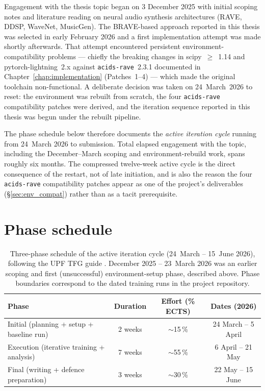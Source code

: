 \documentclass[a4paper,11pt,oneside,openany]{book}
\begin{document}
\begin{appendices}
Engagement with the thesis topic began on 3 December 2025 with initial scoping notes and literature reading on neural audio synthesis architectures (RAVE, DDSP, WaveNet, MusicGen). The BRAVE-based approach reported in this thesis was selected in early February 2026 and a first implementation attempt was made shortly afterwards. That attempt encountered persistent environment-compatibility problems --- chiefly the breaking changes in scipy~$\geq$~1.14 and pytorch-lightning~2.x against \texttt{acids-rave}~2.3.1 documented in Chapter~\ref{chap:implementation} (Patches~1--4) --- which made the original toolchain non-functional. A deliberate decision was taken on 24~March~2026 to reset: the environment was rebuilt from scratch, the four \texttt{acids-rave} compatibility patches were derived, and the iteration sequence reported in this thesis was begun under the rebuilt pipeline.

The phase schedule below therefore documents the \emph{active iteration cycle} running from 24~March 2026 to submission. Total elapsed engagement with the topic, including the December--March scoping and environment-rebuild work, spans roughly six months. The compressed twelve-week active cycle is the direct consequence of the restart, not of late initiation, and is also the reason the four \texttt{acids-rave} compatibility patches appear as one of the project's deliverables (\S\ref{sec:env_compat}) rather than as a tacit prerequisite.

\section{Phase schedule}

\begin{table}[H]
\centering
\caption{Three-phase schedule of the active iteration cycle (24~March -- 15~June 2026), following the UPF TFG guide \parencite{hernandezleo2012tfg}. December 2025 -- 23~March 2026 was an earlier scoping and first (unsuccessful) environment-setup phase, described above. Phase boundaries correspond to the dated training runs in the project repository.}
\label{tab:phases}
\begin{tabular}{lccc}
\toprule
\textbf{Phase} & \textbf{Duration} & \textbf{Effort (\% ECTS)} & \textbf{Dates (2026)} \\
\midrule
Initial (planning + setup + baseline run) & 2 weeks & $\sim$15\,\% & 24 March -- 5 April \\
Execution (iterative training + analysis) & 7 weeks & $\sim$55\,\% & 6 April -- 21 May \\
Final (writing + defence preparation) & 3 weeks & $\sim$30\,\% & 22 May -- 15 June \\
\bottomrule
\end{tabular}
\end{table}


\end{appendices}
\end{document}
